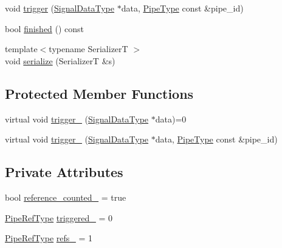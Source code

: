 \begin{DoxyCompactItemize}
void \hyperlink{structvt_1_1pipe_1_1callback_1_1_callback_base_ad54d116447acb7f1d051db946b2e875c}{trigger} (\hyperlink{structvt_1_1pipe_1_1callback_1_1_callback_base_aa1c1fd83b75220a50f6dcd7c1617726e}{Signal\+Data\+Type} $\ast$data, \hyperlink{namespacevt_ac9852acda74d1896f48f406cd72c7bd3}{Pipe\+Type} const \&pipe\+\_\+id)
\item 
bool \hyperlink{structvt_1_1pipe_1_1callback_1_1_callback_base_a20ed519d03b62560080ce3bdb8986f03}{finished} () const
\item 
{\footnotesize template$<$typename SerializerT $>$ }\\void \hyperlink{structvt_1_1pipe_1_1callback_1_1_callback_base_a4baca91fd4545ca13f34c75255209edd}{serialize} (SerializerT \&s)
\end{DoxyCompactItemize}
\subsection*{Protected Member Functions}
\begin{DoxyCompactItemize}
\item 
virtual void \hyperlink{structvt_1_1pipe_1_1callback_1_1_callback_base_a75a9b0103e0129f536385b10b86400c3}{trigger\+\_\+} (\hyperlink{structvt_1_1pipe_1_1callback_1_1_callback_base_aa1c1fd83b75220a50f6dcd7c1617726e}{Signal\+Data\+Type} $\ast$data)=0
\item 
virtual void \hyperlink{structvt_1_1pipe_1_1callback_1_1_callback_base_ac14c6c68a45c6f7e18c73daa45b23b83}{trigger\+\_\+} (\hyperlink{structvt_1_1pipe_1_1callback_1_1_callback_base_aa1c1fd83b75220a50f6dcd7c1617726e}{Signal\+Data\+Type} $\ast$data, \hyperlink{namespacevt_ac9852acda74d1896f48f406cd72c7bd3}{Pipe\+Type} const \&pipe\+\_\+id)
\end{DoxyCompactItemize}
\subsection*{Private Attributes}
\begin{DoxyCompactItemize}
\item 
bool \hyperlink{structvt_1_1pipe_1_1callback_1_1_callback_base_a5b996f1bdf68fe4ef90c8c1fe2241c59}{reference\+\_\+counted\+\_\+} = true
\item 
\hyperlink{namespacevt_ace18d74dd489d9ea506d38789fffce34}{Pipe\+Ref\+Type} \hyperlink{structvt_1_1pipe_1_1callback_1_1_callback_base_a815cf081302f47d4fe68fad7270ac99b}{triggered\+\_\+} = 0
\item 
\hyperlink{namespacevt_ace18d74dd489d9ea506d38789fffce34}{Pipe\+Ref\+Type} \hyperlink{structvt_1_1pipe_1_1callback_1_1_callback_base_ab9464e03ecca5b6ce2186f5cc6e8110f}{refs\+\_\+} = 1
\end{DoxyCompactItemize}


